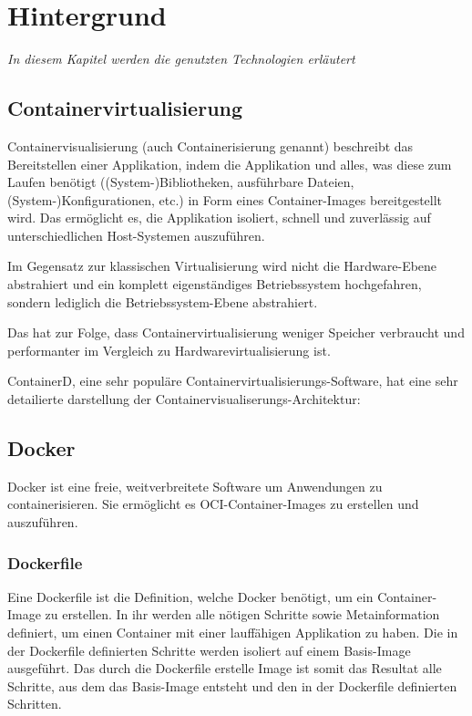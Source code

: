 \chapter{Hintergrund}

\label{cha:background}
\textit{In diesem Kapitel werden die genutzten Technologien erläutert}

\section{Containervirtualisierung}

Containervisualisierung (auch Containerisierung genannt) beschreibt das Bereitstellen einer Applikation, indem die Applikation und alles, was diese zum Laufen benötigt ((System-)Bibliotheken, ausführbare Dateien, (System-)Konfigurationen, etc.) in Form eines Container-Images bereitgestellt wird. Das ermöglicht es, die Applikation isoliert, schnell und zuverlässig auf unterschiedlichen Host-Systemen auszuführen.

Im Gegensatz zur klassischen Virtualisierung wird nicht die Hardware-Ebene abstrahiert und ein komplett eigenständiges Betriebssystem hochgefahren, sondern lediglich die Betriebssystem-Ebene abstrahiert.

Das hat zur Folge, dass Containervirtualisierung weniger Speicher verbraucht und performanter im Vergleich zu Hardwarevirtualisierung ist.

ContainerD, eine sehr populäre Containervirtualisierungs-Software, hat eine sehr detailierte darstellung der Containervisualiserungs-Architektur: 


\section{Docker}

Docker ist eine freie, weitverbreitete Software um Anwendungen zu containerisieren. Sie ermöglicht es OCI-Container-Images zu erstellen und auszuführen.

\subsection{Dockerfile}

Eine Dockerfile ist die Definition, welche Docker benötigt, um ein Container-Image zu erstellen. In ihr werden alle nötigen Schritte sowie Metainformation definiert, um einen Container mit einer lauffähigen Applikation zu haben. Die in der Dockerfile definierten Schritte werden isoliert auf einem Basis-Image ausgeführt. Das durch die Dockerfile erstelle Image ist somit das Resultat alle Schritte, aus dem das Basis-Image entsteht und den in der Dockerfile definierten Schritten.


